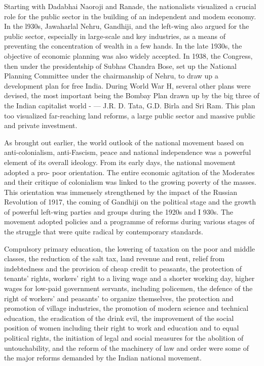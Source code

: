Starting with Dadabhai Naoroji and Ranade, the nationalists visualized a crucial role for the public sector in the building of an independent and modem economy. In the l930s, Jawaharlal Nehru, Gandhiji, and the left-wing also argued for the public sector, especially in large-scale and key industries, as a means of preventing the concentration of wealth in a few hands. In the late 1930s, the objective of economic planning was also widely accepted. In 1938, the Congress, then under the presidentship of Subhas Chandra Bose, set up the National Planning Committee under the chairmanship of Nehru, to draw up a development plan for free India. During World War H, several other plans were devised, the most important being the Bombay Plan drawn up by the big three of the Indian capitalist world - --- J.R. D. Tata, G.D. Birla and Sri Ram. This plan too visualized far-reaching land reforms, a large public sector and massive public and private investment.

As brought out earlier, the world outlook of the national movement based on anti-colonialism, anti-Fascism, peace and national independence was a powerful element of its overall ideology. From its early days, the national movement adopted a pro- poor orientation. The entire economic agitation of the Moderates and their critique of colonialism was linked to the growing poverty of the masses. This orientation was immensely strengthened by the impact of the Russian Revolution of 1917, the coming of Gandhiji on the political stage and the growth of powerful left-wing parties and groups during the 1920s and I 930s. The movement adopted policies and a programme of reforms during various stages of the struggle that were quite radical by contemporary standards.

Compulsory primary education, the lowering of taxation on the poor and middle classes, the reduction of the salt tax, land revenue and rent, relief from indebtedness and the provision of cheap credit to peasants, the protection of tenants' rights, workers' right to a living wage and a shorter working day, higher wages for low-paid government servants, including policemen, the defence of the right of workers' and peasants' to organize themselves, the protection and promotion of village industries, the promotion of modern science and technical education, the eradication of the drink evil, the improvement of the social position of women including their right to work and education and to equal political rights, the initiation of legal and social measures for the abolition of untouchability, and the reform of the machinery of law and order were some of the major reforms demanded by the Indian national movement.

